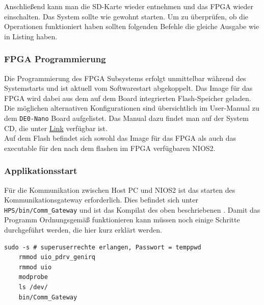 Anschließend kann man die SD-Karte wieder entnehmen und das \ac{FPGA} wieder einschalten. Das System sollte wie gewohnt starten. Um zu überprüfen, ob die Operationen funktioniert haben sollten folgenden Befehle die gleiche Ausgabe wie in Listing  haben. 

\subsubsection{\ac{FPGA} Programmierung}
Die Programmierung des \ac{FPGA} Subsystems erfolgt unmittelbar während des Systemstarts und ist aktuell vom Softwarestart abgekoppelt. Das Image für das \ac{FPGA} wird dabei aus dem auf dem Board integrierten Flash-Speicher geladen. Die möglichen alternativen Konfigurationen sind übersichtlich im User-Manual zu dem \texttt{DE0-Nano} Board aufgelistet. Das Manual dazu findet man auf der System CD, die unter \href{http://www.terasic.com/downloads/cd-rom/de0-nano-soc/}{Link} verfügbar ist.\\

Auf dem Flash befindet sich sowohl das Image für das \ac{FPGA} als auch das executable für den nach dem flashen im \ac{FPGA} verfügbaren NIOS2. 
\subsubsection{Applikationsstart}
Für die Kommunikation zwischen Host PC und NIOS2 ist das starten des Kommunikationsgateway erforderlich. Dies befindet sich unter \texttt{HPS/bin/Comm\_Gateway} und ist das Kompilat des oben beschriebenen . Damit das Programm Ordnungsgemäß funktionieren kann müssen noch einige Schritte durchgeführt werden, die hier kurz erklärt werden.

\lstset{language=bash}
\begin{lstlisting}[caption=Listing, label={StartApp}]
	sudo -s # superuserrechte erlangen, Passwort = temppwd
	rmmod uio_pdrv_genirq
	rmmod uio
	modprobe 
	ls /dev/
	bin/Comm_Gateway
\end{lstlisting}

